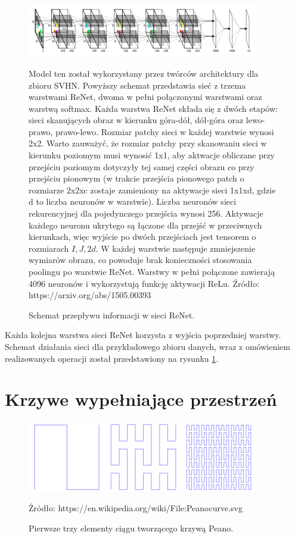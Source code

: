 \documentclass[oneside, mag]{mgr}
\begin{document}
\begin{figure}
\centering
	\includegraphics[width=0.9\textwidth]{img/ReNetArch.png}
	\caption{Schemat przepływu informacji w sieci ReNet.} Model ten został wykorzystany przez twórców architektury dla zbioru SVHN. Powyższy schemat przedstawia sieć z trzema warstwami ReNet, dwoma w pełni połączonymi warstwami oraz warstwą softmax. Każda warstwa ReNet składa się z dwóch etapów: sieci skanujących obraz w kierunku góra-dół, dół-góra oraz lewo-prawo, prawo-lewo. Rozmiar patchy sieci w każdej warstwie wynosi 2x2. Warto zauważyć, że rozmiar patchy przy skanowaniu sieci w kierunku poziomym musi wynosić 1x1, aby aktwacje obliczane przy przejściu poziomym dotyczyły tej samej części obrazu co przy przejściu pionowym (w trakcie przejścia pionowego patch o rozmiarze 2x2xc zostaje zamieniony na aktywacje sieci 1x1xd, gdzie d to liczba neuronów w warstwie). Liczba neuronów sieci rekurencyjnej dla pojedynczego przejścia wynosi 256. Aktywacje każdego neuronu ukrytego są łączone dla przejść w przeciwnych kierunkach, więc wyjście po dwóch przejściach jest tensorem o rozmiarach $I,J,2d$. W każdej warstwie następuje zmniejszenie wymiarów obrazu, co powoduje brak konieczności stosowania poolingu po warstwie ReNet. Warstwy w pełni połączone zawierają 4096 neuronów i wykorzystują funkcję aktywacji ReLu. Źródło: https://arxiv.org/abs/1505.00393
	\label{fig:ReNet}
\end{figure}

Każda kolejna warstwa sieci ReNet korzysta z wyjścia poprzedniej warstwy. Schemat działania sieci dla przykładowego zbioru danych, wraz z omówieniem realizowanych operacji został przedstawiony na rysunku \ref{fig:ReNet}.

\section{Krzywe wypełniające przestrzeń}

\begin{figure}
\centering
	\includegraphics[width=0.9\textwidth]{img/peano_curve.png}
	\caption{Pierwsze trzy elementy ciągu tworzącego krzywą Peano.} Źródło: https://en.wikipedia.org/wiki/File:Peanocurve.svg
	\label{fig:peano}
\end{figure}
\end{document}
